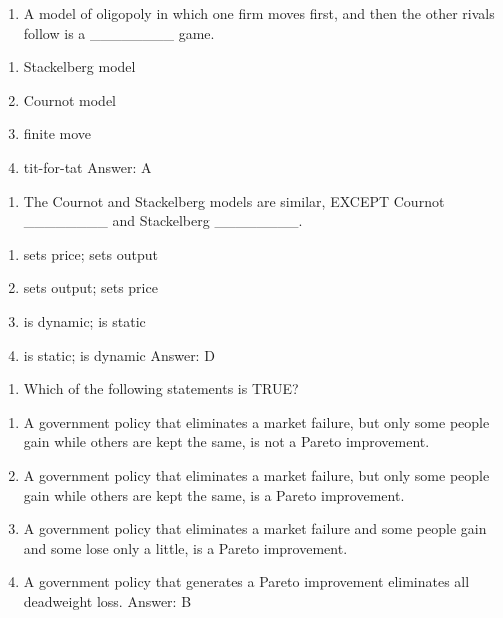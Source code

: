 \documentclass[11pt,]{article}
\providecommand{\tightlist}{%
  \setlength{\itemsep}{0pt}\setlength{\parskip}{0pt}}
\begin{document}
\newpage

\begin{enumerate}
\def\labelenumi{\arabic{enumi})}
\setcounter{enumi}{5}
\tightlist
\item
  A model of oligopoly in which one firm moves first, and then the other
  rivals follow is a \_\_\_\_\_\_\_\_ game.
\end{enumerate}

\begin{enumerate}
\def\labelenumi{\Alph{enumi})}
\tightlist
\item
  Stackelberg model
\item
  Cournot model
\item
  finite move
\item
  tit-for-tat Answer: A
\end{enumerate}

\begin{enumerate}
\def\labelenumi{\arabic{enumi})}
\setcounter{enumi}{6}
\tightlist
\item
  The Cournot and Stackelberg models are similar, EXCEPT Cournot
  \_\_\_\_\_\_\_\_ and Stackelberg \_\_\_\_\_\_\_\_.
\end{enumerate}

\begin{enumerate}
\def\labelenumi{\Alph{enumi})}
\tightlist
\item
  sets price; sets output
\item
  sets output; sets price
\item
  is dynamic; is static
\item
  is static; is dynamic Answer: D
\end{enumerate}

\begin{enumerate}
\def\labelenumi{\arabic{enumi})}
\setcounter{enumi}{7}
\tightlist
\item
  Which of the following statements is TRUE?
\end{enumerate}

\begin{enumerate}
\def\labelenumi{\Alph{enumi})}
\tightlist
\item
  A government policy that eliminates a market failure, but only some
  people gain while others are kept the same, is not a Pareto
  improvement.
\item
  A government policy that eliminates a market failure, but only some
  people gain while others are kept the same, is a Pareto improvement.
\item
  A government policy that eliminates a market failure and some people
  gain and some lose only a little, is a Pareto improvement.
\item
  A government policy that generates a Pareto improvement eliminates all
  deadweight loss. Answer: B
\end{enumerate}
\end{document}
